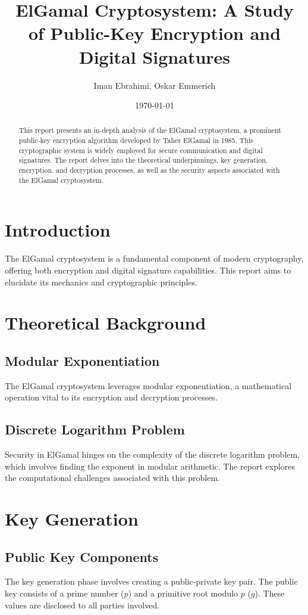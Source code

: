 \documentclass{article}
\title{ElGamal Cryptosystem: A Study of Public-Key Encryption and Digital Signatures}
\author{Iman Ebrahimi, Oskar Emmerich}
\date{\today}
\begin{document}
\maketitle

\begin{abstract}
This report presents an in-depth analysis of the ElGamal cryptosystem, a prominent public-key encryption algorithm developed by Taher ElGamal in 1985. This cryptographic system is widely employed for secure communication and digital signatures. The report delves into the theoretical underpinnings, key generation, encryption, and decryption processes, as well as the security aspects associated with the ElGamal cryptosystem.
\end{abstract}

\section*{Introduction}
The ElGamal cryptosystem is a fundamental component of modern cryptography, offering both encryption and digital signature capabilities. This report aims to elucidate its mechanics and cryptographic principles.

\section*{Theoretical Background}
\subsection*{Modular Exponentiation}
The ElGamal cryptosystem leverages modular exponentiation, a mathematical operation vital to its encryption and decryption processes.

\subsection*{Discrete Logarithm Problem}
Security in ElGamal hinges on the complexity of the discrete logarithm problem, which involves finding the exponent in modular arithmetic. The report explores the computational challenges associated with this problem.

\section*{Key Generation}
\subsection*{Public Key Components}
The key generation phase involves creating a public-private key pair. The public key consists of a prime number ($p$) and a primitive root modulo $p$ ($g$). These values are disclosed to all parties involved.
\end{document}
